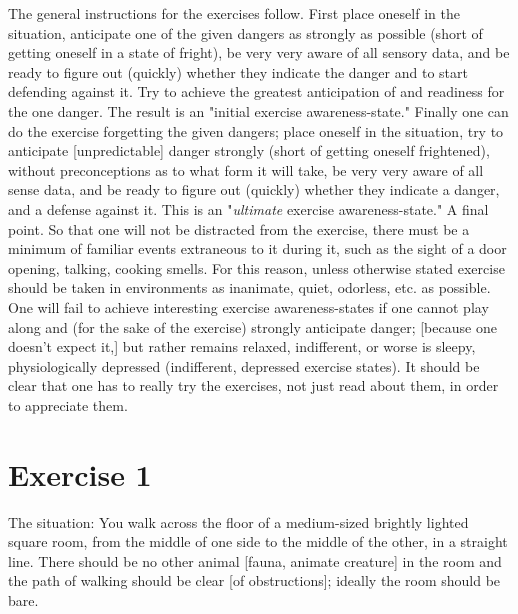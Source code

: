 The general instructions for the exercises follow. First place oneself in the 
situation, anticipate one of the given dangers as strongly as possible (short 
of getting oneself in a state of fright), be very very aware of all sensory data, 
and be ready to figure out (quickly) whether they indicate the danger and to 
start defending against it. Try to achieve the greatest anticipation of and 
readiness for the one danger. The result is an "initial exercise 
awareness-state." Finally one can do the exercise forgetting the given dangers; place 
oneself in the situation, try to anticipate [unpredictable] danger strongly 
(short of getting oneself frightened), without preconceptions as to what form 
it will take, be very very aware of all sense data, and be ready to figure out 
(quickly) whether they indicate a danger, and a defense against it. This is 
an "\emph{ultimate} exercise awareness-state." A final point. So that one will not be 
distracted from the exercise, there must be a minimum of familiar events 
extraneous to it during it, such as the sight of a door opening, talking, 
cooking smells. For this reason, unless otherwise stated exercise should be 
taken in environments as inanimate, quiet, odorless, etc. as possible. One 
will fail to achieve interesting exercise awareness-states if one cannot play 
along and (for the sake of the exercise) strongly anticipate danger; [because 
one doesn't expect it,] but rather remains relaxed, indifferent, or worse is 
sleepy, physiologically depressed (indifferent, depressed exercise states). 
It should be clear that one has to really try the exercises, not just read about 
them, in order to appreciate them. 

\section*{Exercise 1}

The situation: You walk across the floor of a medium-sized brightly lighted 
square room, from the middle of one side to the middle of the other, in a 
straight line. There should be no other animal [fauna, animate creature] in 
the room and the path of walking should be clear [of obstructions]; ideally 
the room should be bare. 


